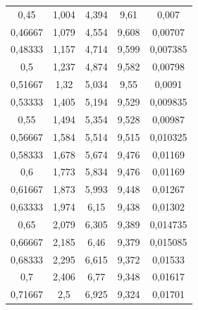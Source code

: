 \documentclass{fkssolpub}
\begin{document}
\begin{table}[h!]
\begin{subtable}[c]{0.5\textwidth}
\begin{tabular}{|c|c|c|c|c|}
0,45 & 1,004 & 4,394 & 9,61 & 0,007 \\
0,46667 & 1,079 & 4,554 & 9,608 & 0,00707 \\
0,48333 & 1,157 & 4,714 & 9,599 & 0,007385 \\
0,5 & 1,237 & 4,874 & 9,582 & 0,00798 \\
0,51667 & 1,32 & 5,034 & 9,55 & 0,0091 \\
0,53333 & 1,405 & 5,194 & 9,529 & 0,009835 \\
0,55 & 1,494 & 5,354 & 9,528 & 0,00987 \\
0,56667 & 1,584 & 5,514 & 9,515 & 0,010325 \\
0,58333 & 1,678 & 5,674 & 9,476 & 0,01169 \\
0,6 & 1,773 & 5,834 & 9,476 & 0,01169 \\
0,61667 & 1,873 & 5,993 & 9,448 & 0,01267 \\
0,63333 & 1,974 & 6,15 & 9,438 & 0,01302 \\
0,65 & 2,079 & 6,305 & 9,389 & 0,014735 \\
0,66667 & 2,185 & 6,46 & 9,379 & 0,015085 \\
0,68333 & 2,295 & 6,615 & 9,372 & 0,01533 \\
0,7 & 2,406 & 6,77 & 9,348 & 0,01617 \\
0,71667 & 2,5 & 6,925 & 9,324 & 0,01701 \\
			\hline
		\end{tabular}

	\end{subtable}
\end{table}
\end{document}
